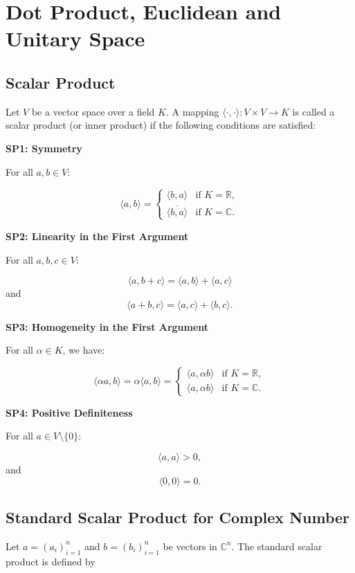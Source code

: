 \section{Dot Product, Euclidean and Unitary Space}

\subsection{Scalar Product}

Let \(V\) be a vector space over a field \(K\). A mapping \(\langle \cdot, \cdot \rangle : V \times V \to K\) is called a scalar product (or inner product) if the following conditions are satisfied:

\textbf{SP1: Symmetry}

For all \(a, b \in V\):

\[
\langle a, b \rangle = 
\begin{cases}
\langle b, a \rangle & \text{if } K = \mathbb{R}, \\
\overline{\langle b, a \rangle} & \text{if } K = \mathbb{C}.
\end{cases}
\]

\textbf{SP2: Linearity in the First Argument}

For all \(a, b, c \in V\):

\[
\langle a, b + c \rangle = \langle a, b \rangle + \langle a, c \rangle
\]
and
\[
\langle a + b, c \rangle = \langle a, c \rangle + \langle b, c \rangle.
\]

\textbf{SP3: Homogeneity in the First Argument}

For all \(\alpha \in K\), we have:

\[
\langle \alpha a, b \rangle = \alpha \langle a, b \rangle = 
\begin{cases}
\langle a, \alpha b \rangle & \text{if } K = \mathbb{R}, \\
\langle a, \alpha b \rangle & \text{if } K = \mathbb{C}.
\end{cases}
\]

\textbf{SP4: Positive Definiteness}

For all \(a \in V \setminus \{0\}\):

\[
\langle a, a \rangle > 0,
\]
and
\[
\langle 0, 0 \rangle = 0.
\]

\subsection{Standard Scalar Product for Complex Number}

Let \( a = (a_i)_{i=1}^n \) and \( b = (b_i)_{i=1}^n \) be vectors in \( \mathbb{C}^n \). The standard scalar product is defined by


